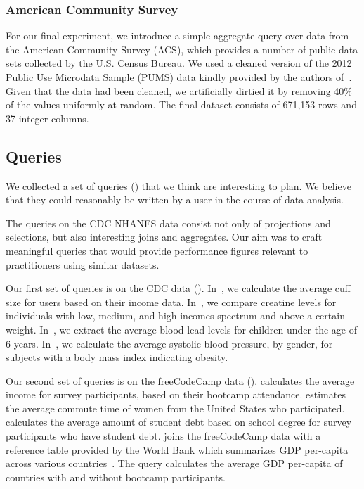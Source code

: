\subsubsection{American Community Survey}
For our final experiment, we introduce a simple aggregate query over data from the American Community Survey (ACS), which
provides a number of public data sets collected by the U.S. Census Bureau.
We used a cleaned version of the 2012 Public Use Microdata Sample (PUMS) data kindly provided by the authors of~\cite{akande2015empirical}.
Given that the data had been cleaned, we artificially dirtied it by removing 40\% of the values uniformly at random.
The final dataset consists of 671,153 rows and 37 integer columns.

\subsection{Queries}
We collected a set of queries () that we think are interesting to plan.
We believe that they could reasonably be written by a user in the course of data analysis.

The queries on the CDC NHANES data consist not only of projections and selections, but also interesting joins and aggregates.
Our aim was to craft meaningful queries
that would provide performance figures relevant to practitioners using
similar datasets.

Our first set of queries is on the CDC data (). In~, we
calculate the average cuff size for users based on their income data. In~, we compare
creatine levels for individuals with low, medium, and high incomes spectrum and above a
certain weight. In~, we extract the average blood lead levels for children under
the age of 6 years. In~, we calculate the average systolic blood pressure, by
gender, for subjects with a body mass index indicating obesity. 

Our second set of queries is on the freeCodeCamp data ().
 calculates the average income for survey participants, based on their bootcamp attendance.
 estimates the average commute time of women from the United States who participated.
 calculates the average amount of student debt based on school degree for survey participants who have student debt.
 joins the freeCodeCamp data with a reference table provided by the World Bank which summarizes GDP per-capita across various countries~\cite{worldbank-data}.
The query calculates the average GDP per-capita of countries with and without bootcamp participants. 

